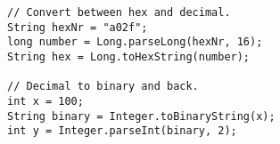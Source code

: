 \begin{verbatim}
// Convert between hex and decimal.
String hexNr = "a02f";
long number = Long.parseLong(hexNr, 16);
String hex = Long.toHexString(number);

// Decimal to binary and back.
int x = 100;
String binary = Integer.toBinaryString(x);
int y = Integer.parseInt(binary, 2);
\end{verbatim}